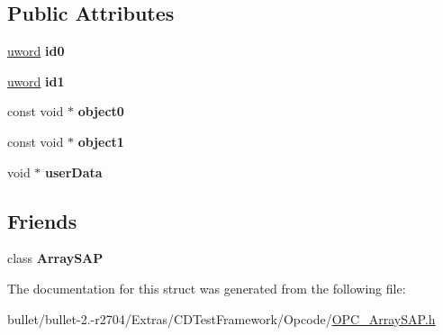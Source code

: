 \subsection*{Public Attributes}
\begin{DoxyCompactItemize}
\item 
\hypertarget{struct_a_s_a_p___pair_ac339cd9ce089bca9653f49cbe2927c53}{\hyperlink{_ice_types_8h_a42fa576a6a3b73c1efc32ab91d176300}{uword} {\bfseries id0}}\label{struct_a_s_a_p___pair_ac339cd9ce089bca9653f49cbe2927c53}

\item 
\hypertarget{struct_a_s_a_p___pair_a30cb069895390905a8aab167d7e59a12}{\hyperlink{_ice_types_8h_a42fa576a6a3b73c1efc32ab91d176300}{uword} {\bfseries id1}}\label{struct_a_s_a_p___pair_a30cb069895390905a8aab167d7e59a12}

\item 
\hypertarget{struct_a_s_a_p___pair_a151f4181ae8a28e418cc2e8ba3387fcb}{const void $\ast$ {\bfseries object0}}\label{struct_a_s_a_p___pair_a151f4181ae8a28e418cc2e8ba3387fcb}

\item 
\hypertarget{struct_a_s_a_p___pair_a287f1e1abe00521330bd861be1311f13}{const void $\ast$ {\bfseries object1}}\label{struct_a_s_a_p___pair_a287f1e1abe00521330bd861be1311f13}

\item 
\hypertarget{struct_a_s_a_p___pair_a34ff33fd3463733b965f4d68d173523c}{void $\ast$ {\bfseries user\+Data}}\label{struct_a_s_a_p___pair_a34ff33fd3463733b965f4d68d173523c}

\end{DoxyCompactItemize}
\subsection*{Friends}
\begin{DoxyCompactItemize}
\item 
\hypertarget{struct_a_s_a_p___pair_a047500c9d872484f0a55989276498363}{class {\bfseries Array\+S\+A\+P}}\label{struct_a_s_a_p___pair_a047500c9d872484f0a55989276498363}

\end{DoxyCompactItemize}


The documentation for this struct was generated from the following file\+:\begin{DoxyCompactItemize}
\item 
bullet/bullet-\/2.-\/r2704/\+Extras/\+C\+D\+Test\+Framework/\+Opcode/\hyperlink{_o_p_c___array_s_a_p_8h}{O\+P\+C\+\_\+\+Array\+S\+A\+P.\+h}\end{DoxyCompactItemize}
